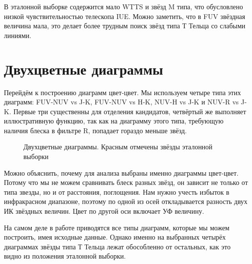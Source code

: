 В эталонной выборке содержится мало WTTS и звёзд M типа, что обусловлено низкой чувствительностью телескопа IUE. Можно заметить, что в FUV звёздная величина мала, это делает более трудным поиск звёзд типа Т Тельца со слабыми линиями.

\section{Двухцветные диаграммы}
Перейдём к построению диаграмм цвет-цвет. Мы используем четыре типа этих диаграмм: FUV-NUV vs J-K, FUV-NUV vs H-K, NUV-H vs J-K и NUV-R vs J-K. Первые три существенны для отделения кандидатов, четвёртый же выполняет иллюстративную функцию, так как на диаграмму этого типа, требующую наличия блеска в фильтре R, попадает гораздо меньше звёзд.

\begin{figure}[ht]
\begin{minipage}[ht]{0.49\linewidth}
\end{minipage}
\hfill
\begin{minipage}[ht]{0.49\linewidth}
\end{minipage}
\begin{minipage}[ht]{0.49\linewidth}
\end{minipage}
\hfill
\begin{minipage}[ht]{0.49\linewidth}
\end{minipage}
\caption{Двухцветные диаграммы. Красным отмечены звёзды эталонной выборки}
\label{fig:colcol}
\end{figure}
Можно объяснить, почему для анализа выбраны именно диаграммы цвет-цвет. Потому что мы не можем сравнивать блеск разных звёзд, он зависит не только от типа звезды, но и от расстояния, поглощения. Нам нужно учесть избыток в инфракрасном диапазоне, поэтому по одной из осей откладывается разность двух ИК звёздных величин. Цвет по другой оси включает УФ величину.

На самом деле в работе \cite{AIGdC2014galex}  приводятся все типы диаграмм, которые мы можем построить, имея исходные данные. Однако именно на выбранных четырёх диаграммах звёзды типа Т Тельца лежат обособленно от остальных, как это видно из положения эталонной выборки.

